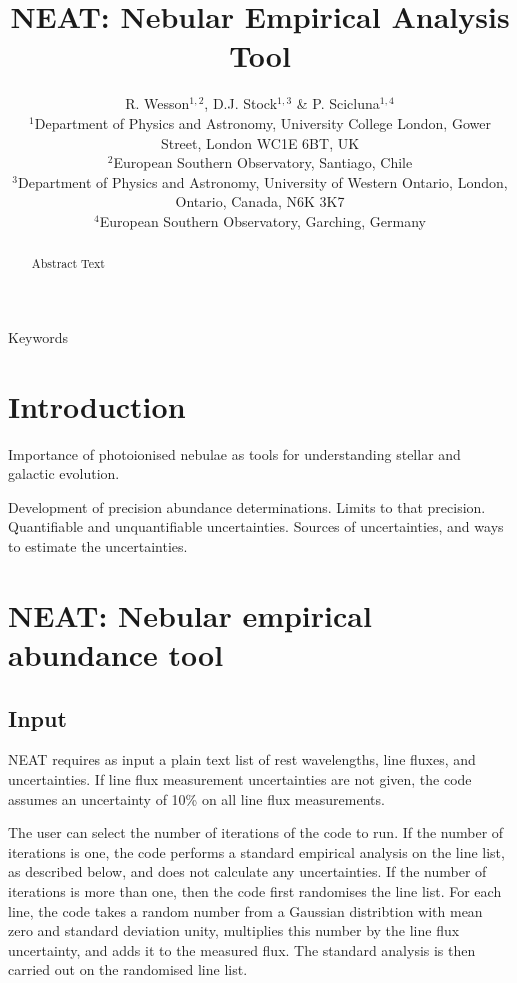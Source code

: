 \documentclass[useAMS,usenatbib]{mn2e}
\title[NEAT]{NEAT: Nebular Empirical Analysis Tool} %
\author[R. Wesson et al.]{R. Wesson$^{1,2}$, D.J. Stock$^{1,3}$ \& P. Scicluna$^{1,4}$\\
$^1$Department of Physics and Astronomy, University College London, Gower Street, London WC1E 6BT, UK\\
$^2$European Southern Observatory, Santiago, Chile \\ %
$^3$Department of Physics and Astronomy, University of Western Ontario, London, Ontario, Canada, N6K 3K7\\
$^4$European Southern Observatory, Garching, Germany\\ %
}
\begin{document}
\date{}

\pagerange{\pageref{firstpage}--\pageref{lastpage}} 

\maketitle

\label{firstpage}

\begin{abstract}
Abstract Text
\end{abstract}

\begin{keywords}
Keywords
\end{keywords}

\section{Introduction}

Importance of photoionised nebulae as tools for understanding stellar and galactic evolution.

Development of precision abundance determinations.  Limits to that precision.  Quantifiable and unquantifiable uncertainties.  Sources of uncertainties, and ways to estimate the uncertainties.

\section{NEAT: Nebular empirical abundance tool}

\subsection{Input}

NEAT requires as input a plain text list of rest wavelengths, line fluxes, and uncertainties.  If line flux measurement uncertainties are not given, the code assumes an uncertainty of 10\% on all line flux measurements.

The user can select the number of iterations of the code to run.  If the number of iterations is one, the code performs a standard empirical analysis on the line list, as described below, and does not calculate any uncertainties.  If the number of iterations is more than one, then the code first randomises the line list.  For each line, the code takes a random number from a Gaussian distribtion with mean zero and standard deviation unity, multiplies this number by the line flux uncertainty, and adds it to the measured flux.  The standard analysis is then carried out on the randomised line list.
\end{document}

